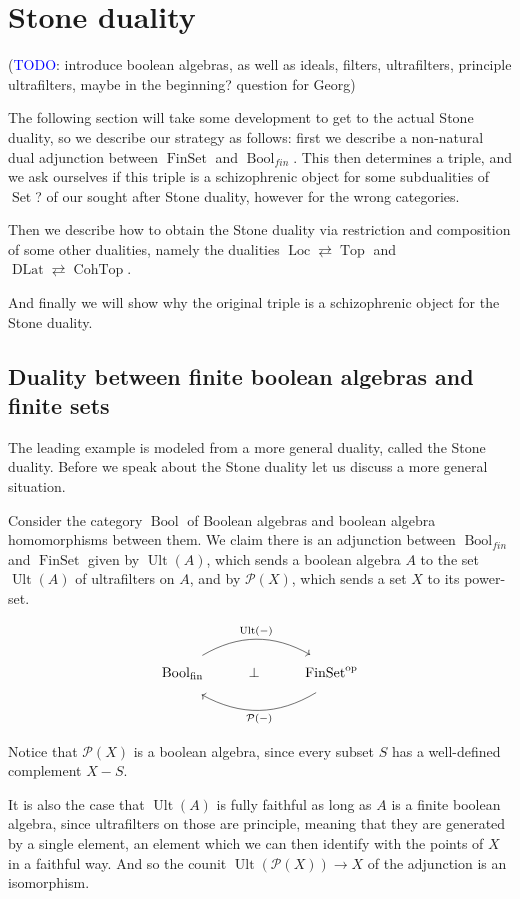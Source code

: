 \documentclass[12pt,a4paper]{article}
\DeclareMathOperator{\Set}{Set}
\DeclareMathOperator{\Top}{Top}
\DeclareMathOperator{\Bool}{Bool}
\DeclareMathOperator{\op}{op}
\DeclareMathOperator{\Ult}{Ult}
\DeclareMathOperator{\FinSet}{FinSet}
\DeclareMathOperator{\DLat}{DLat}
\DeclareMathOperator{\Loc}{Loc}
\DeclareMathOperator{\CohTop}{CohTop}
\begin{document}
\section{Stone duality}

(\textcolor{blue}{TODO}: introduce boolean algebras, as well as ideals, filters, ultrafilters, principle ultrafilters, maybe in the beginning? question for Georg) 


The following section will take some development to get to the actual Stone duality, so we describe our strategy as follows: first we describe a non-natural dual adjunction between $\FinSet$ and $\Bool_{fin}$. This then determines a triple, and we ask ourselves if this triple is a schizophrenic object for some subdualities of $\Set$? of our sought after Stone duality, however for the wrong categories.

Then we describe how to obtain the Stone duality via restriction and composition of some other dualities, namely the dualities  $\Loc \rightleftarrows \Top$ and   $\DLat \rightleftarrows \CohTop$.

And finally we will show why the original triple is a schizophrenic object for the Stone duality.
\subsection{Duality between finite boolean algebras and finite sets}
The leading example is modeled from a more general duality, called the Stone duality. Before we speak about the Stone duality let us discuss a more general situation.

Consider the category $\Bool$ of Boolean algebras and boolean algebra homomorphisms between them. We claim there is an adjunction between $\Bool_{fin}$ and $\FinSet$ given by $\Ult(A)$, which sends a boolean algebra $A$ to the set $\Ult(A)$ of ultrafilters on $A$, and by $\mathcal{P}(X)$, which sends a set $X$ to its power-set.

\[\begin{tikzcd}
	\Bool_{\text{fin}} & \bot & \FinSet^{\op}
	\arrow["{\Ult(-)}", shift left=2, bend left, from=1-1, to=1-3]
	\arrow["{\mathcal{P}(-)}", shift left=3, bend left, from=1-3, to=1-1]
\end{tikzcd}\]

Notice that $\mathcal{P}(X)$ is a boolean algebra, since every subset $S$ has a well-defined complement $X - S$. 


It is also the case that $\Ult(A)$ is  fully faithful as long as $A$ is a finite boolean algebra, since ultrafilters on those are principle, meaning that they are generated by a single element, an element which we can then identify with the points of $X$ in a faithful way. And so the counit $\Ult(\mathcal{P}(X)) \to X$ of the adjunction is an isomorphism.
 
\end{document}
